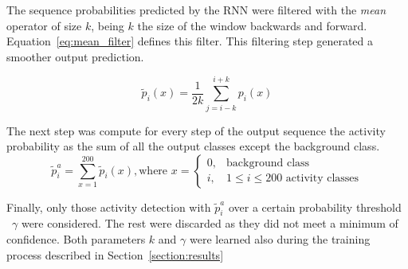 The sequence probabilities predicted by the RNN were filtered with the \textit{mean} operator of size $k$, being $k$ the size of the window backwards and forward. Equation~\ref{eq:mean_filter} defines this filter. This filtering step generated a smoother output prediction.

\begin{equation}
	\tilde{p}_i(x) = \frac{1}{2k} \sum_{j=i-k}^{i+k} p_i(x)
    \label{eq:mean_filter}
\end{equation}

The next step was compute for every step of the output sequence the activity probability as the sum of all the output classes except the background class.
\begin{equation}
	\tilde{p}^a_i = \sum_{x=1}^{200}\tilde{p}_i(x), \text{where } x = \begin{cases}
        0, & \text{background class} \\
        i, & 1 \leq i \leq 200 \text{ activity classes}
    \end{cases}
\end{equation}


Finally, only those activity detection with $\tilde{p}^a_i$ over a certain probability threshold ~$\gamma$ were considered. The rest were discarded as they did not meet a minimum of confidence. Both parameters $k$ and $\gamma$ were learned also during the training process described in Section~\ref{section:results}


